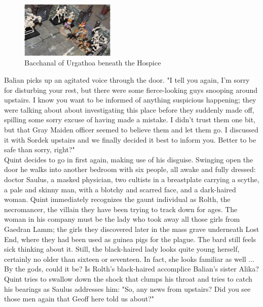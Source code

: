 \begin{figure}[h]
	\centering
	\includegraphics[width=0.4\textwidth]{images/Bacchanal-of-Urgathoa-beneath-the-Hospice-520054146_mod.jpg}
	\caption{Bacchanal of Urgathoa beneath the Hospice}
	\label{fig:Bacchanal-of-Urgathoa-beneath-the-Hospice-520054146}
\end{figure}

Balian picks up an agitated voice through the door. "I tell you again, I'm sorry for disturbing your rest, but there were some fierce-looking guys snooping around upstairs. I know you want to be informed of anything suspicious happening; they were talking about about investigating this place before they suddenly made off, spilling some sorry excuse of having made a mistake. I didn't trust them one bit, but that Gray Maiden officer seemed to believe them and let them go. I discussed it with Sordek upstairs and we finally decided it best to inform you. Better to be safe than sorry, right?"\\

Quint decides to go in first again, making use of his disguise. Swinging open the door he walks into another bedroom with six people, all awake and fully dressed: doctor Saulus, a masked physician, two cultists in a breastplate carrying a scythe, a pale and skinny man, with a blotchy and scarred face, and a dark-haired woman. Quint immediately recognizes the gaunt individual as Rolth, the necromancer, the villain they have been trying to track down for ages. The woman in his company must be the lady who took away all those girls from Gaedran Lamm; the girls they discovered later in the mass grave underneath Lost End, where they had been used as guinea pigs for the plague. The bard still feels sick thinking about it. Still, the black-haired lady looks quite young herself, certainly no older than sixteen or seventeen. In fact, she looks familiar as well ... By the gods, could it be? Is Rolth's black-haired accomplice Balian's sister Alika? Quint tries to swallow down the shock that clumps his throat and tries to catch his bearings as Saulus addresses him: "So, any news from upstairs? Did you see those men again that Geoff here told us about?"\\

